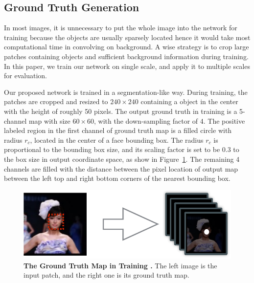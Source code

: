 \subsection{Ground Truth Generation} 

In most images, it is unnecessary to put the whole image into the network for training because the objects are usually sparsely located hence it would take most computational time in convolving on background. A wise strategy is to crop large patches containing objects and sufficient background information during training. In this paper, we train our network on single scale, and apply it to multiple scales for evaluation. 

Our proposed network is trained in a segmentation-like way. During training, the patches are cropped and resized to $240 \times 240$ containing a object in the center with the height of roughly 50 pixels. The output ground truth in training is a 5-channel map with size $60 \times 60 $, with the down-sampling factor of 4. The positive labeled region in the first channel of ground truth map is a filled circle with radius $r_c$, located in the center of a face bounding box. The radius $r_c$ is proportional to the bounding box size, and its scaling factor is set to be 0.3 to the box size in output coordinate space, as show in Figure~\ref{fig:fig_gt}. The remaining 4 channels are filled with the distance between the pixel location of output map between the left top and right bottom corners of the nearest bounding box.  

\begin{figure}[!hbtp]
\centering
\includegraphics[scale=0.55]{figures/figure2-crop.pdf}
\caption{\textbf{The Ground Truth Map in Training .} The left image is the input patch, and the right one is its ground truth map. }
\label{fig:fig_gt}
\end{figure}

